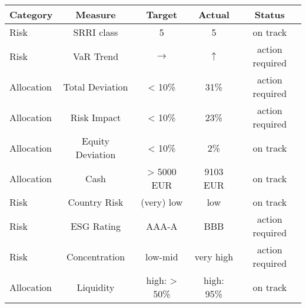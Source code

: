 \center
\begin{tabular}{l|c|c|c|c}
Category & Measure & Target & Actual & Status \\\hline\hline
Risk & SRRI class & 5 & 5 & \colorbox{octariskgreen}{on track} \\\hline
Risk & VaR Trend & $\rightarrow$ & $\uparrow$ & \colorbox{octariskorange}{action required} \\\hline
Allocation & Total Deviation & < 10\% &  31\% & \colorbox{octariskorange}{action required} \\\hline
Allocation & Risk Impact & < 10\% &  23\% & \colorbox{octariskorange}{action required} \\\hline
Allocation & Equity Deviation & < 10\% &   2\% & \colorbox{octariskgreen}{on track} \\\hline
Allocation & Cash & >     5000 EUR &      9103 EUR & \colorbox{octariskgreen}{on track} \\\hline
Risk & Country Risk & (very) low & low & \colorbox{octariskgreen}{on track} \\\hline
Risk & ESG Rating & AAA-A & BBB & \colorbox{octariskorange}{action required} \\\hline
Risk & Concentration & low-mid & very high & \colorbox{octariskorange}{action required} \\\hline
Allocation & Liquidity & high: > 50\%& high:  95\%& \colorbox{octariskgreen}{on track} \\\hline
\end{tabular}
